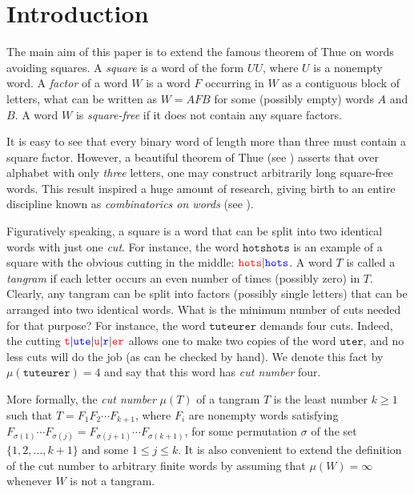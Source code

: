 \documentclass[12pt]{amsart}
\theoremstyle{plain}
\numberwithin{equation}{section}
\begin{document}
	\maketitle
	
\section{Introduction}\label{Section Introduction}
The main aim of this paper is to extend the famous theorem of Thue \cite{Thue} on words avoiding squares. A \emph{square} is a word of the form $UU$, where $U$ is a nonempty word. A \emph{factor} of a word $W$ is a word $F$ occurring in $W$ as a contiguous block of letters, what can be written as $W=AFB$ for some (possibly empty) words $A$ and $B$. A word $W$ is \emph{square-free} if it does not contain any square factors.

It is easy to see that every binary word of length more than three must contain a square factor. However, a beautiful theorem of Thue \cite{Thue} (see \cite{BerstelThue,Lothaire}) asserts that over alphabet with only \emph{three} letters, one may construct arbitrarily long square-free words. This result inspired a huge amount of research, giving birth to an entire discipline known as \emph{combinatorics on words} (see \cite{BeanEM,BerstelPerrin,Lothaire,LothaireAlgebraic}).

Figuratively speaking, a square is a word that can be split into two identical words with just one \emph{cut}. For instance, the word $\mathtt{hotshots}$ is an example of a square with the obvious cutting in the middle: $\mathtt{\color{red}{hots}\color{black}|\color{blue}{hots}}$. A word $T$ is called a \emph{tangram} if each letter occurs an even number of times (possibly zero) in $T$. Clearly, any tangram can be split into factors (possibly single letters) that can be arranged into two identical words. What is the minimum number of cuts needed for that purpose? For instance, the word $\mathtt{tuteurer}$ demands four cuts. Indeed, the cutting $\mathtt{\color{red}t\color{black}|\color{blue}ute\color{black}|\color{red}u\color{black}|\color{blue}r\color{black}|\color{red}er}$ allows one to make two copies of the word $\mathtt{uter}$, and no less cuts will do the job (as can be checked by hand). We denote this fact by $\mu(\mathtt{tuteurer})=4$ and say that this word has \emph{cut number} four.

More formally, the \emph{cut number} $\mu(T)$ of a tangram $T$ is the least number $k\geqslant 1$ such that $T=F_1F_2\cdots F_{k+1}$, where $F_i$ are nonempty words satisfying $F_{\sigma(1)}\cdots F_{\sigma(j)}=F_{\sigma(j+1)}\cdots F_{\sigma(k+1)}$, for some permutation $\sigma$ of the set $\{1,2,\ldots, k+1\}$ and some $1\leqslant j\leqslant k$. It is also convenient to extend the definition of the cut number to arbitrary finite words by assuming that $\mu(W)=\infty$ whenever $W$ is not a tangram.
\end{document}
